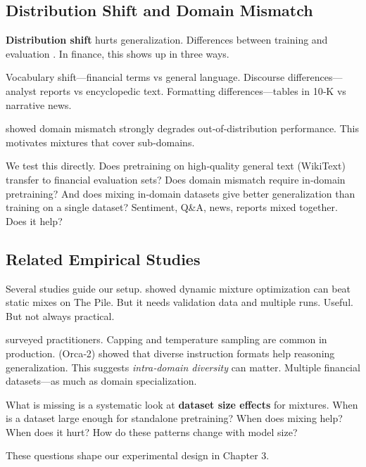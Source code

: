 \subsection{Distribution Shift and Domain Mismatch}

\textbf{Distribution shift} hurts generalization. Differences between training and evaluation \parencite{quinonero2009dataset}. In finance, this shows up in three ways.

Vocabulary shift—financial terms vs general language. Discourse differences—analyst reports vs encyclopedic text. Formatting differences—tables in 10‑K vs narrative news.

\textcite{aharoni2020unsupervised} showed domain mismatch strongly degrades out‑of‑distribution performance. This motivates mixtures that cover sub‑domains.

We test this directly. Does pretraining on high‑quality general text (WikiText) transfer to financial evaluation sets? Does domain mismatch require in‑domain pretraining? And does mixing in‑domain datasets give better generalization than training on a single dataset? Sentiment, Q\&A, news, reports mixed together. Does it help?

\subsection{Related Empirical Studies}

Several studies guide our setup. \textcite{xie2023doremi} showed dynamic mixture optimization can beat static mixes on The Pile. But it needs validation data and multiple runs. Useful. But not always practical.

\textcite{longpre2023pretrainer} surveyed practitioners. Capping and temperature sampling are common in production. \textcite{mitra2023orca2} (Orca‑2) showed that diverse instruction formats help reasoning generalization. This suggests \textit{intra‑domain diversity} can matter. Multiple financial datasets—as much as domain specialization.

What is missing is a systematic look at \textbf{dataset size effects} for mixtures. When is a dataset large enough for standalone pretraining? When does mixing help? When does it hurt? How do these patterns change with model size?

These questions shape our experimental design in Chapter 3.
